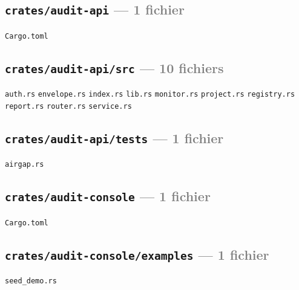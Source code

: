 \documentclass[10pt]{report}
\newcommand{\code}[1]{\texttt{\small #1}}
\begin{document}
\subsection*{\code{crates/audit-api} \normalfont\textcolor{grey}{--- 1 fichier}}
\begin{sloppypar}\footnotesize\raggedright
\code{Cargo.toml}
\end{sloppypar}

\subsection*{\code{crates/audit-api/src} \normalfont\textcolor{grey}{--- 10 fichiers}}
\begin{sloppypar}\footnotesize\raggedright
\code{auth.rs} \;\textbullet\; \code{envelope.rs} \;\textbullet\; \code{index.rs} \;\textbullet\; \code{lib.rs} \;\textbullet\; \code{monitor.rs} \;\textbullet\; \code{project.rs} \;\textbullet\; \code{registry.rs} \;\textbullet\; \code{report.rs} \;\textbullet\; \code{router.rs} \;\textbullet\; \code{service.rs}
\end{sloppypar}

\subsection*{\code{crates/audit-api/tests} \normalfont\textcolor{grey}{--- 1 fichier}}
\begin{sloppypar}\footnotesize\raggedright
\code{airgap.rs}
\end{sloppypar}

\subsection*{\code{crates/audit-console} \normalfont\textcolor{grey}{--- 1 fichier}}
\begin{sloppypar}\footnotesize\raggedright
\code{Cargo.toml}
\end{sloppypar}

\subsection*{\code{crates/audit-console/examples} \normalfont\textcolor{grey}{--- 1 fichier}}
\begin{sloppypar}\footnotesize\raggedright
\code{seed\_demo.rs}
\end{sloppypar}
\end{document}
